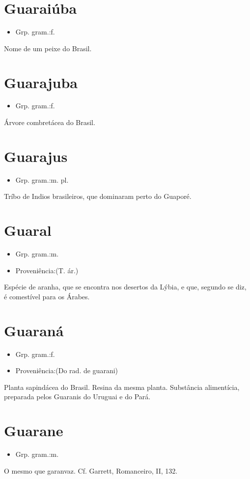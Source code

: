 \section{Guaraiúba}
\begin{itemize}
\item {Grp. gram.:f.}
\end{itemize}
Nome de um peixe do Brasil.
\section{Guarajuba}
\begin{itemize}
\item {Grp. gram.:f.}
\end{itemize}
Árvore combretácea do Brasil.
\section{Guarajus}
\begin{itemize}
\item {Grp. gram.:m. pl.}
\end{itemize}
Tríbo de Indios brasileiros, que dominaram perto do Guaporé.
\section{Guaral}
\begin{itemize}
\item {Grp. gram.:m.}
\end{itemize}
\begin{itemize}
\item {Proveniência:(T. ár.)}
\end{itemize}
Espécie de aranha, que se encontra nos desertos da Lýbia, e que, segundo se diz, é comestível para os Árabes.
\section{Guaraná}
\begin{itemize}
\item {Grp. gram.:f.}
\end{itemize}
\begin{itemize}
\item {Proveniência:(Do rad. de \textunderscore guarani\textunderscore )}
\end{itemize}
Planta sapindácea do Brasil.
Resina da mesma planta.
Substância alimentícia, preparada pelos Guaranis do Uruguai e do Pará.
\section{Guarane}
\begin{itemize}
\item {Grp. gram.:m.}
\end{itemize}
O mesmo que \textunderscore garanvaz\textunderscore . Cf. Garrett, \textunderscore Romanceiro\textunderscore , II, 132.
